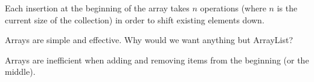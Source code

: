 \begin{quote}
\end{quote}
\vspace{-1em}

\begin{answer}
Each insertion at the beginning of the array takes $n$ operations (where $n$ is the current size of the collection) in order to shift existing elements down.
\end{answer}


\Q \label{key2}
Arrays are simple and effective. Why would we want anything but ArrayList?

\begin{answer}
Arrays are inefficient when adding and removing items from the beginning (or the middle).
\end{answer}

